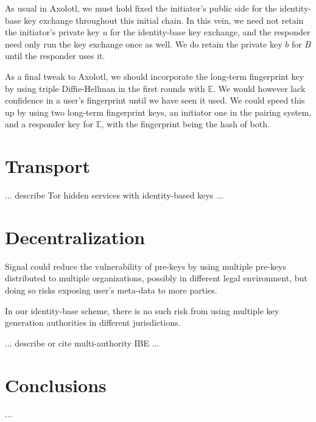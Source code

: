 \documentclass[twoside,letterpaper]{sig-alternate}
\begin{document}
As usual in Axolotl, we must hold fixed the initiator's public side
 for the identity-base key exchange throughout this initial chain.
In this vein, we need not retain the initiator's private key $u$ for
 the identity-base key exchange, and
 the responder need only run the key exchange once as well.
We do retain the private key $b$ for $B$ until the responder uses it.

As a final tweak to Axolotl, we should incorporate
the long-term fingerprint key by using triple Diffie-Hellman
in the first rounds with $\mathbb{E}$.  
We would however lack confidence in a user's fingerprint until
we have seen it used. 
We could speed this up by using two long-term fingerprint keys,
an initiator one in the pairing system, and
 a responder key for $\mathbb{E}$,
with the fingerprint being the hash of both.

\section{Transport}

... describe Tor hidden services with identity-based keys ...

\section{Decentralization}

Signal could reduce the vulnerability of pre-keys by using
multiple pre-keys distributed to multiple organizations,
 possibly in different legal environment, but
doing so risks exposing user's meta-data to more parties.

In our identity-base scheme, there is no such risk from using
multiple key generation authorities in different jurisdictions.

... describe or cite multi-authority IBE ...

\section{Conclusions} 

...







\end{document}
